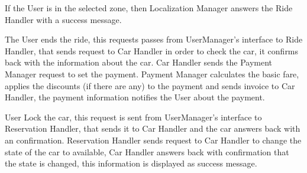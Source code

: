		If the User is in the selected zone, then Localization Manager answers the Ride Handler with a success message.  
		
		The User ends the ride, this requests passes from UserManager's interface to Ride Handler, that sends request to Car Handler in order to check the car,   it confirms back with the information about the car. Car Handler sends the Payment Manager request to set the payment. Payment Manager calculates the basic fare, applies the discounts (if there are any) to the payment and sends invoice to Car Handler, the payment information notifies the User about the payment. 
		
		
		User Lock the car, this request is sent from UserManager's interface to Reservation Handler, that sends it to Car Handler and the car answers back with an confirmation. Reservation Handler sends request to Car Handler to change the state of the car to available, Car Handler answers back with confirmation that the state is changed, this information is displayed as success message.    
